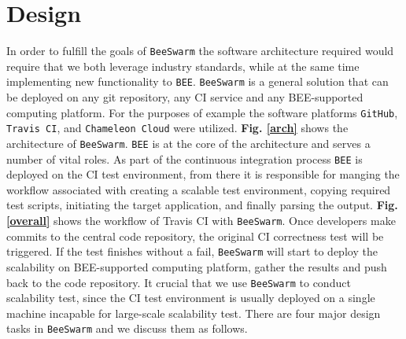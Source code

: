 






\section{Design}
\label{design}
In order to fulfill the goals of \texttt{BeeSwarm} the software architecture required would require that we both leverage industry standards, while at the same time implementing new functionality to \texttt{BEE}\cite{bee}. \texttt{BeeSwarm} is a general solution that can be deployed on any git repository, any CI service and any BEE-supported computing platform. For the purposes of example the software platforms \texttt{GitHub}, 
\texttt{Travis CI}, and \texttt{Chameleon Cloud}\cite{mambretti2015next}
were utilized. \textbf{Fig. \ref{arch}} shows the architecture of \texttt{BeeSwarm}. \texttt{BEE} is at the core of the architecture and serves a number of vital roles. As part of the continuous integration process \texttt{BEE} is deployed on the CI test environment, from there it is responsible for manging the workflow associated with creating a scalable test environment, copying required test scripts, initiating the target application, and finally parsing the output. %
\textbf{Fig. \ref{overall}} shows the workflow of Travis CI with \texttt{BeeSwarm}. Once developers make commits to the central code repository, the original CI correctness test will be triggered. If the test finishes without a fail, \texttt{BeeSwarm} will start to deploy the scalability on BEE-supported computing platform, gather the results and push back to the code repository. It crucial that we use \texttt{BeeSwarm} to conduct scalability test, since the CI test environment is usually deployed on a single machine incapable for large-scale scalability test. There are four major design tasks in \texttt{BeeSwarm} and we discuss them as follows.








